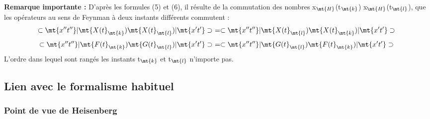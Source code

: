 {\bf Remarque importante :} D'après les formules (5) et (6), il résulte de la commutation des nombres
x$_\mt{H}$(t$_\mt{k}$) x$_\mt{H}$(t$_\mt{l}$), que les opérateurs au sens de Feynman à deux instants
différents commutent :
\[
\subset \mt{x''t''} | \mt{X(t}_\mt{k}) \mt{ X(t}_\mt{l}) | \mt{x't'}\supset\ =
\subset \mt{x''t''} | \mt{X(t}_\mt{l}) \mt{ X(t}_\mt{k}) | \mt{x't'}\supset\
\]
\[
\subset \mt{x''t''} | \mt{F(t}_\mt{k}) \mt{ G(t}_\mt{l}) | \mt{x't'}\supset\ =
\subset \mt{x''t''} | \mt{G(t}_\mt{l}) \mt{ F(t}_\mt{k}) | \mt{x't'}\supset\
\]
L'ordre dans lequel sont rangés les instants t$_\mt{k}$ et t$_\mt{l}$ n'importe pas.

\subsection{Lien avec le formalisme habituel}%
\subsubsection{Point de vue de Heisenberg}%

